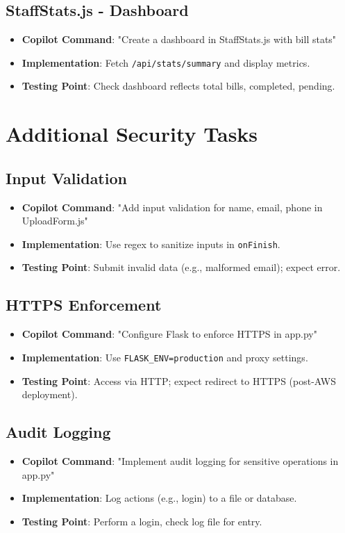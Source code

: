 \documentclass[a4paper,12pt]{article}
\begin{document}
\subsection{StaffStats.js - Dashboard}
\begin{itemize}
    \item \textbf{Copilot Command}: "Create a dashboard in StaffStats.js with bill stats"
    \item \textbf{Implementation}: Fetch \texttt{/api/stats/summary} and display metrics.
    \item \textbf{Testing Point}: Check dashboard reflects total bills, completed, pending.
\end{itemize}

\section{Additional Security Tasks}

\subsection{Input Validation}
\begin{itemize}
    \item \textbf{Copilot Command}: "Add input validation for name, email, phone in UploadForm.js"
    \item \textbf{Implementation}: Use regex to sanitize inputs in \texttt{onFinish}.
    \item \textbf{Testing Point}: Submit invalid data (e.g., malformed email); expect error.
\end{itemize}

\subsection{HTTPS Enforcement}
\begin{itemize}
    \item \textbf{Copilot Command}: "Configure Flask to enforce HTTPS in app.py"
    \item \textbf{Implementation}: Use \texttt{FLASK_ENV=production} and proxy settings.
    \item \textbf{Testing Point}: Access via HTTP; expect redirect to HTTPS (post-AWS deployment).
\end{itemize}

\subsection{Audit Logging}
\begin{itemize}
    \item \textbf{Copilot Command}: "Implement audit logging for sensitive operations in app.py"
    \item \textbf{Implementation}: Log actions (e.g., login) to a file or database.
    \item \textbf{Testing Point}: Perform a login, check log file for entry.
\end{itemize}
\end{document}
